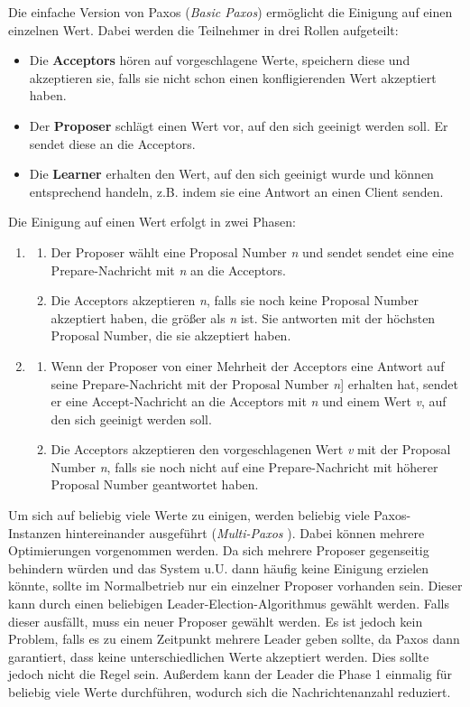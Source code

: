 Die einfache Version von Paxos (\textit{Basic Paxos}) ermöglicht die Einigung auf einen einzelnen Wert. Dabei werden die Teilnehmer in drei Rollen aufgeteilt:
\begin{itemize}
	\item Die \textbf{Acceptors} hören auf vorgeschlagene Werte, speichern diese und akzeptieren sie, falls sie nicht schon einen konfligierenden Wert akzeptiert haben.
	\item Der \textbf{Proposer} schlägt einen Wert vor, auf den sich geeinigt werden soll. Er sendet diese an die Acceptors.
	\item Die \textbf{Learner} erhalten den Wert, auf den sich geeinigt wurde und können entsprechend handeln, z.B. indem sie eine Antwort an einen Client senden.
\end{itemize}

Die Einigung auf einen Wert erfolgt in zwei Phasen:

\begin{enumerate}
	\item 
		\begin{enumerate}[label=\alph*)]
			\item Der Proposer wählt eine Proposal Number \textit{n} und sendet sendet eine eine Prepare-Nachricht mit  \textit{n} an die Acceptors. 
			\item Die Acceptors akzeptieren \textit{n}, falls sie noch keine Proposal Number akzeptiert haben, die größer als \textit{n} ist. Sie antworten mit der höchsten Proposal Number, die sie akzeptiert haben.
		\end{enumerate}
	\item
		\begin{enumerate}[label=\alph*)]
		\item Wenn der Proposer von einer Mehrheit der Acceptors eine Antwort auf seine Prepare-Nachricht mit der Proposal Number \textit{n}] erhalten hat, sendet er eine Accept-Nachricht an die Acceptors mit \textit{n} und einem Wert \textit{v}, auf den sich geeinigt werden soll.
		\item Die Acceptors akzeptieren den vorgeschlagenen Wert \textit{v} mit der Proposal Number \textit{n}, falls sie noch nicht auf eine Prepare-Nachricht mit höherer Proposal Number geantwortet haben.
	\end{enumerate}
\end{enumerate}

Um sich auf beliebig viele Werte zu einigen, werden beliebig viele Paxos-Instanzen hintereinander ausgeführt (\textit{Multi-Paxos} \cite{paxos-made-live}). Dabei können mehrere Optimierungen vorgenommen werden. Da sich mehrere Proposer gegenseitig behindern würden und das System u.U. dann häufig keine Einigung erzielen könnte, sollte im Normalbetrieb nur ein einzelner Proposer vorhanden sein. Dieser kann durch einen beliebigen Leader-Election-Algorithmus gewählt werden. Falls dieser ausfällt, muss ein neuer Proposer gewählt werden. Es ist jedoch kein Problem, falls es zu einem Zeitpunkt mehrere Leader geben sollte, da Paxos dann garantiert, dass keine unterschiedlichen Werte akzeptiert werden. Dies sollte jedoch nicht die Regel sein. Außerdem kann der Leader die Phase 1 einmalig für beliebig viele Werte durchführen, wodurch sich die Nachrichtenanzahl reduziert.

